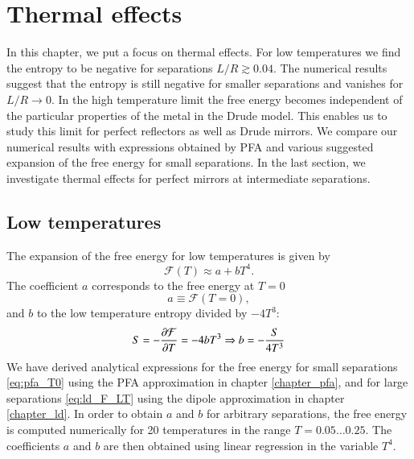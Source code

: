 \chapter{Thermal effects}

In this chapter, we put a focus on thermal effects. For low temperatures we
find the entropy to be negative for separations $L/R \gtrsim 0.04$. The
numerical results suggest that the entropy is still negative for smaller
separations and vanishes for $L/R\to0$. In the high temperature limit the free
energy becomes independent of the particular properties of the metal in the
Drude model. This enables us to study this limit for perfect reflectors as well
as Drude mirrors. We compare our numerical results with expressions obtained by
PFA and various suggested expansion of the free energy for small separations.
In the last section, we investigate thermal effects for perfect mirrors at
intermediate separations.


\section{Low temperatures}
\label{section_thermal_low_temp}

The expansion of the free energy for low temperatures is given by
\begin{equation}
\label{eq:temp_lt_approx}
\mathcal{F}(T) \approx a+bT^4.
\end{equation}
The coefficient $a$ corresponds to the free energy at $T=0$
\begin{equation}
a \equiv \mathcal{F}(T=0),
\end{equation}
and $b$ to the low temperature entropy divided by $-4T^3$:
\begin{equation}
S = -\frac{\partial\mathcal{F}}{\partial T} = -4bT^3 \\ \Rightarrow b = -\frac{S}{4T^3}
\end{equation}
We have derived analytical expressions for the free energy for small separations
\eqref{eq:pfa_T0} using the PFA approximation in chapter \ref{chapter_pfa}, and for large separations
\eqref{eq:ld_F_LT} using the dipole approximation in chapter \ref{chapter_ld}.
In order to obtain $a$ and $b$ for arbitrary separations, the free
energy is computed numerically for 20 temperatures in the range $T=0.05\dots0.25$. The
coefficients $a$ and $b$ are then obtained using linear regression in the
variable $T^4$.

